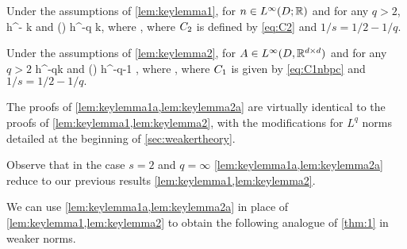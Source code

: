 \label{lem:keylemma1a}
Under the assumptions of \cref{lem:keylemma1}, for $n\in \LiDRR$ and for any $q > 2$,
\beq\label{eq:keybound12}
\max\set{\NDk{\AmatoI \Mmatn},\NDkI{\Mmatn\AmatoI}} \leq \Cttilde h^{-} k
\eeq
and 
\beq\label{eq:keybound1a2}
\max\set{\Nt{\AmatoI \Mmatn},\Nt{\Mmatn\AmatoI}} \leq \Cttilde\mleft(\frac{\mplus}{\mminus}\mright) h^{-q} k,
\eeq
where
\beq\label{eq:C2tilde}
\Cttilde\de%
\Cinvs\Ct,
\eeq
where $C_{2}$ is defined by \cref{eq:C2} and $1/s = 1/2 - 1/q.$
\ele

\label{lem:keylemma2a}
Under the assumptions of \cref{lem:keylemma2}, for $A\in L^\infty(D,\mathbb R^{d\times d})$ and for any $q > 2$
\beq\label{eq:keybound22}
\max\set{\NDk{\AmatoI \SmatA},\NDkI{\SmatA\AmatoI}} \leq \Cotilde h^{-q}k 
\eeq
and
\beq\label{eq:keybound2a2}
\max\set{\Nt{\AmatoI \SmatA},\Nt{\SmatA\AmatoI}} \leq \Cotilde\mleft(\frac{\splus}{\mminus}\mright) h^{-q-1} ,
\eeq
where
\beq\label{eq:C1tildenbpc}
\Cotilde \de \Cinvs\Co,
\eeq
where $C_{1}$ is given by \cref{eq:C1nbpc} and $1/s = 1/2 - 1/q.$
\ele

The proofs of \cref{lem:keylemma1a,lem:keylemma2a} are virtually identical to the proofs of \cref{lem:keylemma1,lem:keylemma2}, with the modifications for $L^q$ norms detailed at the beginning of \cref{sec:weakertheory}.

Observe that in the case $s=2$ and $q=\infty$ \cref{lem:keylemma1a,lem:keylemma2a} reduce to our previous results \cref{lem:keylemma1,lem:keylemma2}.
\ere

We can use \cref{lem:keylemma1a,lem:keylemma2a} in place of \cref{lem:keylemma1,lem:keylemma2} to obtain the following analogue of \cref{thm:1} in weaker norms.

